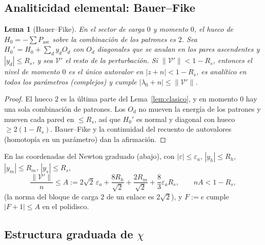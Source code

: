 \documentclass[11pt,a4paper]{article}
\newtheorem{lema}[teorema]{Lema}
\theoremstyle{definition}
\theoremstyle{remark}
\newcommand{\Pasc}{P_{\mathrm{asc}}}
\newcommand{\eps}{\varepsilon}
\begin{document}
\subsection{Analiticidad elemental: Bauer--Fike}

\begin{lema}[Bauer--Fike]\label{lem:bf}
En el sector de carga $0$ y momento $0$, el hueco de $H_0=-\sum\Pasc$ sobre la combinación de los
patrones es $2$. Sea $H_0'=H_0+\sum_{d}y_dO_d$ con $O_d$ diagonales que se anulan en los pares
ascendentes y $|y_d|\le R_s$, y sea $\mathcal V'$ el resto de la perturbación. Si $\|\mathcal V'\|<1-R_s$, entonces el
nivel de momento $0$ es el único autovalor en $|z+n|<1-R_s$, es analítico en todos los parámetros
(complejos) y cumple $|\lambda_0+n|\le\|\mathcal V'\|$.
\end{lema}

\begin{proof}
El hueco $2$ es la última parte del Lema~\ref{lem:clasico}, y en momento $0$ hay una sola combinación
de patrones. Los $O_d$ no mueven la energía de los patrones y mueven cada pared en $\le R_s$, así que
$H_0'$ es normal y diagonal con hueco $\ge2(1-R_s)$. Bauer--Fike y la continuidad del recuento de
autovalores (homotopía en un parámetro) dan la afirmación.
\end{proof}

En las coordenadas del Newton graduado (abajo), con $|\eps|\le\eps_a$, $|y_h|\le R_h$, $|y_m|\le R_m$,
$|y_s|\le R_s$,
\begin{equation}\label{eq:A}
  \frac{\|\mathcal V'\|}n\le A:=2\sqrt2\,\eps_a+\frac{8R_h}{\sqrt2}+\frac{2R_m}{\sqrt2}+\frac83\eps_aR_s,
  \qquad nA<1-R_s,
\end{equation}
(la norma del bloque de carga $2$ de un enlace es $2\sqrt2$), y $F:=e$ cumple $|F+1|\le A$ en el
polidisco.

\subsection{Estructura graduada de $\chi$}
\end{document}
